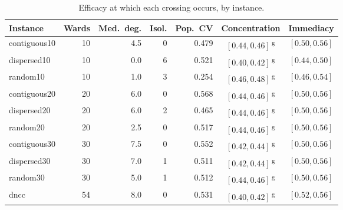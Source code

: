 \begin{table}[htbp]
	\centering\small
	\caption{Efficacy at which each crossing occurs, by instance.}
	\label{tab:crossings}
	\begin{tabular}{@{}lrrrrcc@{}}
		\toprule
		Instance & Wards & Med.\ deg. & Isol. & Pop.\ CV & Concentration & Immediacy \\
		\midrule
		contiguous10 & 10 & 4.5 & 0 & 0.479 & $[0.44, 0.46]$\,\textsuperscript{g} & $[0.50, 0.56]$ \\
		dispersed10 & 10 & 0.0 & 6 & 0.521 & $[0.40, 0.42]$\,\textsuperscript{g} & $[0.44, 0.50]$ \\
		random10 & 10 & 1.0 & 3 & 0.254 & $[0.46, 0.48]$\,\textsuperscript{g} & $[0.46, 0.54]$ \\
		contiguous20 & 20 & 6.0 & 0 & 0.568 & $[0.44, 0.46]$\,\textsuperscript{g} & $[0.50, 0.56]$ \\
		dispersed20 & 20 & 6.0 & 2 & 0.465 & $[0.44, 0.46]$\,\textsuperscript{g} & $[0.50, 0.56]$ \\
		random20 & 20 & 2.5 & 0 & 0.517 & $[0.44, 0.46]$\,\textsuperscript{g} & $[0.50, 0.56]$ \\
		contiguous30 & 30 & 7.5 & 0 & 0.552 & $[0.42, 0.44]$\,\textsuperscript{g} & $[0.50, 0.56]$ \\
		dispersed30 & 30 & 7.0 & 1 & 0.511 & $[0.42, 0.44]$\,\textsuperscript{g} & $[0.50, 0.56]$ \\
		random30 & 30 & 5.0 & 1 & 0.512 & $[0.44, 0.46]$\,\textsuperscript{g} & $[0.50, 0.56]$ \\
		dncc & 54 & 8.0 & 0 & 0.531 & $[0.40, 0.42]$\,\textsuperscript{g} & $[0.52, 0.56]$ \\
		\bottomrule
	\end{tabular}
\end{table}